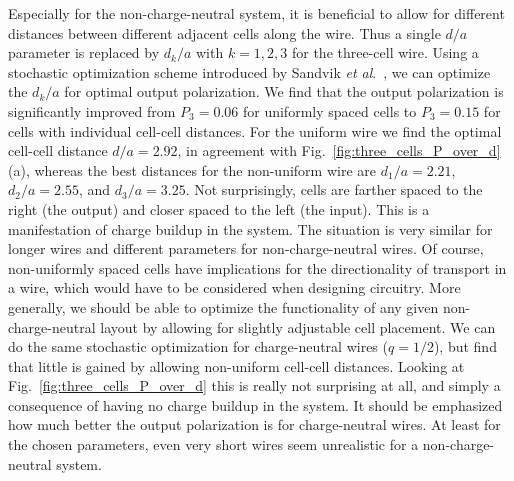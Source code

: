 Especially for the non-charge-neutral system, it is beneficial to allow for
different distances between different adjacent cells along the wire. Thus a
single $d/a$ parameter is replaced by $d_k/a$ with $k = 1,2,3$ for the
three-cell wire. Using a stochastic optimization scheme introduced by Sandvik
\emph{et al}.\ \cite{Sandvik2007}, we can optimize the $d_k/a$ for optimal
output polarization. We find that the output polarization is significantly
improved from $P_3 = 0.06$ for uniformly spaced cells to $P_3 = 0.15$ for cells
with individual cell-cell distances. For the uniform wire we find the optimal
cell-cell distance $d/a = 2.92$, in agreement with
Fig.~\ref{fig:three_cells_P_over_d}(a), whereas the best distances for the
non-uniform wire are $d_1/a = 2.21$, $d_2/a = 2.55$, and $d_3/a = 3.25$. 
Not surprisingly, cells are farther spaced
to the right (the output) and closer spaced to the left (the input). This is a
manifestation of charge buildup in the system. The situation is very similar for
longer wires and different parameters for non-charge-neutral wires. Of course,
non-uniformly spaced cells have implications for the directionality of
transport in a wire, which would have to be considered when designing 
circuitry. More generally, we should be able to optimize the functionality of
any given non-charge-neutral  layout by allowing for slightly
adjustable cell placement. We can do the same stochastic optimization for
charge-neutral wires ($q=1/2$), but find that little is gained by allowing
non-uniform cell-cell distances. Looking at Fig.~\ref{fig:three_cells_P_over_d}
this is really not surprising at all, and simply a consequence of having no
charge buildup in the system. It should be emphasized how much better the output
polarization is for charge-neutral wires. At least for the chosen parameters,
even very short wires seem unrealistic for a non-charge-neutral system.

